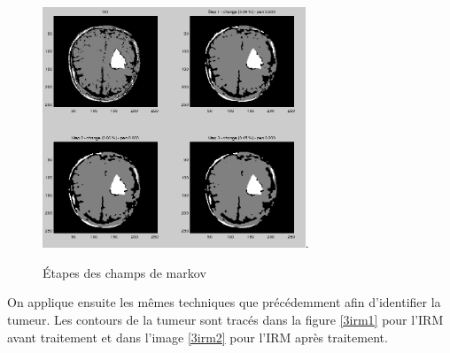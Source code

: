 	\begin{figure}[H]
		\centering
		\includegraphics[width=0.7\textwidth]{images/3-etapes.png}.
		\caption{Étapes des champs de markov}
		\label{fig:etapes}
	\end{figure}

	On applique ensuite les mêmes techniques que précédemment afin d'identifier la tumeur. Les contours de la tumeur sont tracés dans la figure \ref{3irm1} pour l'IRM avant traitement et dans l'image \ref{3irm2} pour l'IRM après traitement.\\

